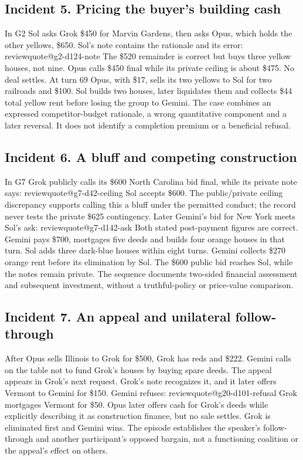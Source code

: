 \documentclass[11pt,letterpaper]{article}
\makeatletter
\newcommand{\q}[1]{\csname reviewquote@#1\endcsname}
\makeatother
\begin{document}
\subsection{Incident 5. Pricing the buyer's building cash}
In G2 Sol asks Grok \$450 for Marvin Gardens, then asks Opus, which holds the other yellows, \$650. Sol's note contains the rationale and its error:
\q{g2-d124-note}
The \$520 remainder is correct but buys three yellow houses, not nine. Opus calls \$450 final while its private ceiling is about \$475. No deal settles. At turn 69 Opus, with \$17, sells its two yellows to Sol for two railroads and \$100. Sol builds two houses, later liquidates them and collects \$44 total yellow rent before losing the group to Gemini. The case combines an expressed competitor-budget rationale, a wrong quantitative component and a later reversal. It does not identify a completion premium or a beneficial refusal.

\subsection{Incident 6. A bluff and competing construction}
In G7 Grok publicly calls its \$600 North Carolina bid final, while its private note says:
\q{g7-d42-ceiling}
Sol accepts \$600. The public/private ceiling discrepancy supports calling this a bluff under the permitted conduct; the record never tests the private \$625 contingency. Later Gemini's bid for New York meets Sol's ask:
\q{g7-d142-ask}
Both stated post-payment figures are correct. Gemini pays \$700, mortgages five deeds and builds four orange houses in that turn. Sol adds three dark-blue houses within eight turns. Gemini collects \$270 orange rent before its elimination by Sol. The \$600 public bid reaches Sol, while the notes remain private. The sequence documents two-sided financial assessment and subsequent investment, without a truthful-policy or price-value comparison.

\subsection{Incident 7. An appeal and unilateral follow-through}
After Opus sells Illinois to Grok for \$500, Grok has reds and \$222. Gemini calls on the table not to fund Grok's houses by buying spare deeds. The appeal appears in Grok's next request. Grok's note recognizes it, and it later offers Vermont to Gemini for \$150. Gemini refuses:
\q{g20-d101-refusal}
Grok mortgages Vermont for \$50. Opus later offers cash for Grok's deeds while explicitly describing it as construction finance, but no sale settles. Grok is eliminated first and Gemini wins. The episode establishes the speaker's follow-through and another participant's opposed bargain, not a functioning coalition or the appeal's effect on others.
\end{document}
